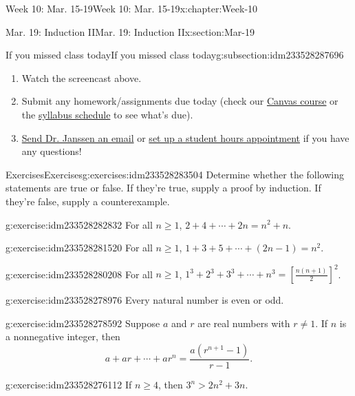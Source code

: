\documentclass[oneside,10pt,]{book}
\numberwithin{equation}{section}
\renewcommand{\ge}{\geqslant}
\newcommand{\gt}{>}
\begin{document}
\begin{chapterptx}{Week 10: Mar. 15-19}{}{Week 10: Mar. 15-19}{}{}{x:chapter:Week-10}
\begin{sectionptx}{Mar. 19: Induction II}{}{Mar. 19: Induction II}{}{}{x:section:Mar-19}
\begin{subsectionptx}{If you missed class today}{}{If you missed class today}{}{}{g:subsection:idm233528287696}
\begin{enumerate}
\item{}Watch the screencast above.%
\item{}Submit any homework\slash{}assignments due today (check our \href{https://dordt.instructure.com/courses/3110050}{Canvas course} or the \href{https://prof.mkjanssen.org/ds/index.html\#schedule}{syllabus schedule} to see what's due).%
\item{}\href{mailto:mike.janssen@dordt.edu}{Send Dr. Janssen an email} or \href{https://calendly.com/mkjanssen/student-hours}{set up a student hours appointment} if you have any questions!%
\end{enumerate}
\end{subsectionptx}
%
%
\typeout{************************************************}
\typeout{************************************************}
%
\begin{exercises-subsection}{Exercises}{}{Exercises}{}{}{g:exercises:idm233528283504}
Determine whether the following statements are true or false. If they're true, supply a proof by induction. If they're false, supply a counterexample.%
\begin{divisionexercise}{1}{}{}{g:exercise:idm233528282832}%
For all \(n\ge 1\), \(2 + 4 + \cdots + 2n = n^2 + n\).%
\end{divisionexercise}%
\begin{divisionexercise}{2}{}{}{g:exercise:idm233528281520}%
For all \(n\ge 1\), \(1+3+5+\cdots+(2n-1) = n^2\).%
\end{divisionexercise}%
\begin{divisionexercise}{3}{}{}{g:exercise:idm233528280208}%
For all \(n\ge 1\), \(1^3 + 2^3 + 3^3 + \cdots + n^3 = \left[\frac{n(n+1)}{2}\right]^2\).%
\end{divisionexercise}%
\begin{divisionexercise}{4}{}{}{g:exercise:idm233528278976}%
Every natural number is even or odd.%
\end{divisionexercise}%
\begin{divisionexercise}{5}{}{}{g:exercise:idm233528278592}%
Suppose \(a\) and \(r\) are real numbers with \(r\ne 1\). If \(n\) is a nonnegative integer, then%
\begin{equation*}
a + ar + \cdots + ar^n = \frac{a(r^{n+1}-1)}{r-1}.
\end{equation*}
%
\end{divisionexercise}%
\begin{divisionexercise}{6}{}{}{g:exercise:idm233528276112}%
If \(n\ge 4\), then \(3^n \gt 2n^2 + 3n\).%
\end{divisionexercise}%
\end{exercises-subsection}
\end{sectionptx}
\end{chapterptx}
\end{document}
